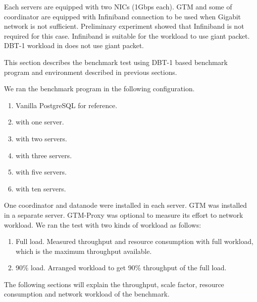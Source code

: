   Each servers are equipped with two NICs (1Gbps each).
  GTM and some of coordinator are equipped with Infiniband connection to be used when
  Gigabit network is not sufficient.
  Preliminary experiment showed that Infiniband is not required for this case.
  Infiniband is suitable for the workload to use giant packet.
  DBT-1 workload in \XC{} does not use giant packet.




  This section describes the benchmark test using DBT-1 based benchmark program and
  environment described in previous sections.
  
  We ran the benchmark program in the following configuration.
  
  \begin{enumerate}
	  \item Vanilla PostgreSQL for reference.
	  \item \XC{} with one server.
	  \item \XC{} with two servers.
	  \item \XC{} with three servers.
	  \item \XC{} with five servers.
	  \item \XC{} with ten servers.
  \end{enumerate}
  
  One coordinator and datanode were installed in each server.
  GTM was installed in a separate server.
  GTM-Proxy was optional to measure its effort to network workload.
  We ran the test with two kinds of workload as follows:
  
  \begin{enumerate}
	  \item Full load. Measured throughput and resource consumption with full workload, which is
	  		the maximum throughput available.
	  \item 90\% load. Arranged workload to get 90\% throughput of the full load.
  \end{enumerate}
  
  The following sections will explain the throughput, scale factor, resource consumption and
  network workload of the benchmark.




